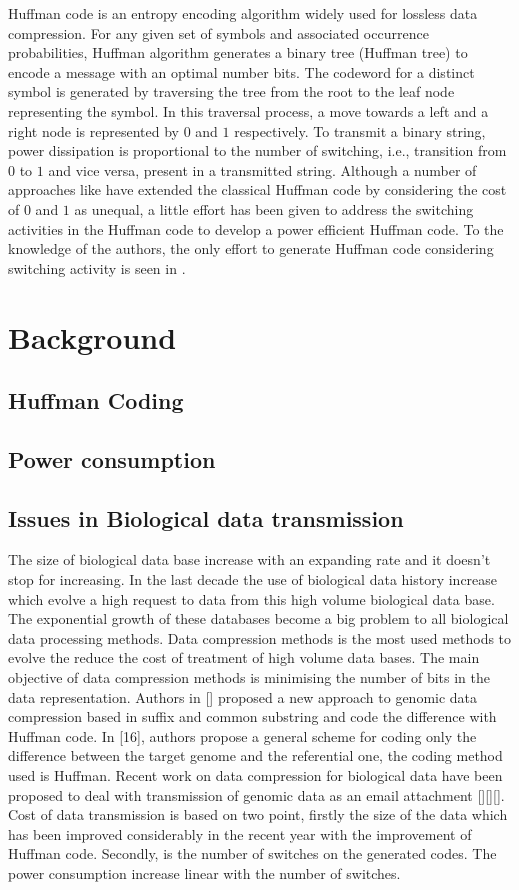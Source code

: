\documentclass[preprint,12pt]{elsarticle}
\begin{document}
Huffman code \cite{Huff51} is an entropy
encoding algorithm widely used for lossless data compression. For any given set of symbols and associated occurrence probabilities, Huffman algorithm generates a binary tree (Huffman tree) to encode a message with an optimal number bits. The codeword for a distinct symbol is generated by traversing the tree from the root to
the leaf node representing the symbol. In this traversal process, a move towards a left and a right node is represented by $0$ and $1$ respectively. To transmit a binary string, power dissipation  is proportional to the number of switching, i.e., transition from $0$ to $1$ and vice versa, present in a transmitted string. Although a number of approaches like \cite{Gol12,Kab14} have extended the classical Huffman code by considering the cost of $0$ and $1$ as unequal, a little effort has been given to address the switching activities in the Huffman code to develop a power efficient Huffman code. To the knowledge of the authors, the only effort to generate Huffman code considering switching activity is seen in \cite{Chen06}.  
\section{Background}
\subsection{Huffman Coding}
\subsection{Power consumption}
\subsection{Issues in Biological data transmission}
The size of biological data base increase with an expanding rate and it doesn't stop for increasing. In the last decade the use of biological data history increase which evolve a high request to data from this high volume biological data base. The exponential growth of these databases become a big problem to all biological data processing methods. Data compression methods is the most used methods to evolve the reduce the cost of treatment of high volume data bases.  The main objective of data compression methods is minimising the number of bits in the data representation. Authors in [] proposed a new approach to genomic data compression based in suffix and common substring and code the difference with Huffman code. In [16], authors propose a general scheme for coding only the difference between the target genome and the referential one, the coding method used is Huffman. Recent work on data compression for biological data have been proposed to deal with transmission of genomic data as an email attachment [][][]. Cost of data transmission is based on two point, firstly the size of the data which has been improved considerably in the recent year with the improvement of Huffman code. Secondly, is the number of switches on the generated codes. The power consumption increase linear with the number of switches.
\end{document}
